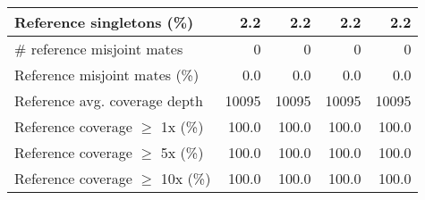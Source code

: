 \documentclass[12pt,a4paper]{article}
\begin{document}
\begin{table}[ht]
\begin{center}
\begin{tabular}{|l*{4}{|r}|}
Reference singletons (\%) & 2.2 & 2.2 & 2.2 & 2.2 \\ \hline
\# reference misjoint mates & 0 & 0 & 0 & 0 \\ \hline
Reference misjoint mates (\%) & 0.0 & 0.0 & 0.0 & 0.0 \\ \hline
Reference avg. coverage depth & 10095 & 10095 & 10095 & 10095 \\ \hline
Reference coverage $\geq$ 1x (\%) & 100.0 & 100.0 & 100.0 & 100.0 \\ \hline
Reference coverage $\geq$ 5x (\%) & 100.0 & 100.0 & 100.0 & 100.0 \\ \hline
Reference coverage $\geq$ 10x (\%) & 100.0 & 100.0 & 100.0 & 100.0 \\ \hline
\end{tabular}
\end{center}
\end{table}
\end{document}
